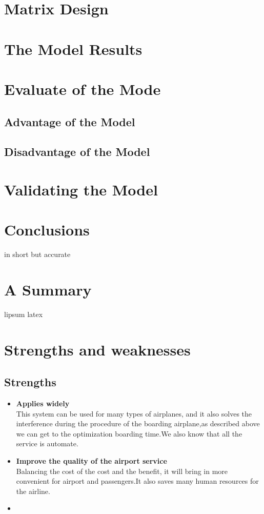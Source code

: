 \documentclass{mcmthesis}
\begin{document}
\section{Matrix Design}

\section{The Model Results}


\section{Evaluate of the Mode}
\subsection{Advantage of the Model}
\subsection{Disadvantage of the Model}

\section{Validating the Model}


\section{Conclusions}
in short but accurate

\section{A Summary}
\lipsum[6]
lipsum latex

\section{Strengths and weaknesses}
\lipsum[12]

\subsection{Strengths}
\begin{itemize}
	\item \textbf{Applies widely}\\
	This  system can be used for many types of airplanes, and it also
	solves the interference during  the procedure of the boarding
	airplane,as described above we can get to the  optimization
	boarding time.We also know that all the service is automate.
	\item \textbf{Improve the quality of the airport service}\\
	Balancing the cost of the cost and the benefit, it will bring in
	more convenient  for airport and passengers.It also saves many
	human resources for the airline. \item \textbf{}
\end{itemize}
\end{document}
